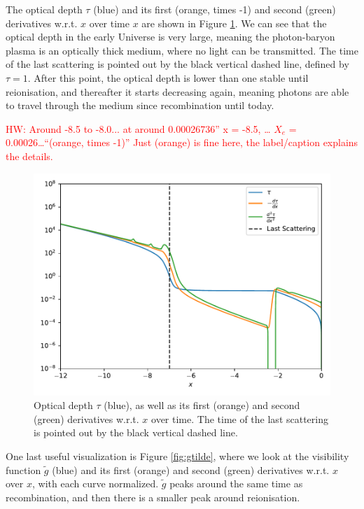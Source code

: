 \documentclass{aa}
\newcommand{\hw}[1]{\textcolor{red}{HW: #1}}
\begin{document}
The optical depth $\tau$ (blue) and its first (orange, times -1) and second (green) derivatives w.r.t. $x$ over time $x$ are shown in Figure \ref{fig:tau}. We can see that the optical depth in the early Universe is very large, meaning the photon-baryon plasma is an optically thick medium, where no light can be transmitted. The time of the last scattering is pointed out by the black vertical dashed line, defined by $\tau=1$. After this point, the optical depth is lower than one stable until reionisation, and thereafter it starts decreasing again, meaning photons are able to travel through the medium since recombination until today.

\hw{Around -8.5 to -8.0...  at around 0.00026736”  x = -8.5, … $X_e$ = 0.00026…“(orange, times -1)” Just (orange) is fine here, the label/caption explains the details.}

\begin{figure}[ht]
    \centering
    \includegraphics[width=\hsize]{report/figures/tau.pdf}
    \caption{Optical depth $\tau$ (blue), as well as its first (orange) and second (green) derivatives w.r.t. $x$ over time. The time of the last scattering is pointed out by the black vertical dashed line.}
    \label{fig:tau}
\end{figure}

One last useful visualization is Figure \ref{fig:gtilde}, where we look at the visibility function $\tilde g$ (blue) and its first (orange) and second (green) derivatives w.r.t. $x$ over $x$, with each curve normalized. $\tilde g$ peaks around the same time as recombination, and then there is a smaller peak around reionisation.
\end{document}
